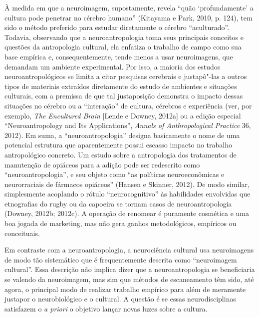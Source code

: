 À medida em que a neuroimagem, supostamente, revela ``quão
`profundamente' a cultura pode penetrar no cérebro humano'' (Kitayama
e Park, 2010, p. 124), tem sido o método preferido para estudar
diretamente o cérebro ``aculturado''. Todavia, observando que a
neuroantropologia toma seus principais conceitos e questões da
antropologia cultural, ela enfatiza o trabalho de campo como sua base
empírica e, consequentemente, tende menos a usar neuroimagens, que
demandam um ambiente experimental. Por isso, a maioria dos estudos
neuroantropológicos se limita a citar pesquisas cerebrais e justapô"-las
a outros tipos de materiais extraídos diretamente do estudo de ambientes
e situações culturais, com a premissa de que tal justaposição demonstra
o impacto dessas situações no cérebro ou a ``interação'' de cultura,
cérebros e experiência (ver, por exemplo, \emph{The Encultured Brain}
{[}Lende e Downey, 2012a{]} ou a edição especial ``Neuroantropology and
Its Applications'', \emph{Annals of Anthropological Practice} 36, 2012).
Em suma, a ``neuroantropologia'' designa basicamente o nome de uma
potencial estrutura que aparentemente possui escasso impacto no trabalho
antropológico concreto. Um estudo sobre a antropologia dos tratamentos
de manutenção de opiáceos para a adição pode ser redescrito como
``neuroantropologia'', e seu objeto como ``as políticas neuroeconômicas
e neurorraciais de fármacos opiáceos'' (Hansen e Skinner, 2012). De modo
similar, simplesmente acoplando o rótulo ``neurocognitivo'' às
habilidades envolvidas que etnografias do rugby ou da capoeira se tornam
casos de neuroantropologia (Downey, 2012b; 2012c). A operação de
renomear é puramente cosmética e uma boa jogada de marketing, mas não
gera ganhos metodológicos, empíricos ou conceituais.

Em contraste com a neuroantropologia, a neurociência cultural usa
neuroimagens de modo tão sistemático que é frequentemente descrita como
``neuroimagem cultural''. Essa descrição não implica dizer que a
neuroantropologia se beneficiaria se valendo da neuroimagem, mas sim que
métodos de escaneamento têm sido, até agora, o principal modo de
realizar trabalho empírico para além de meramente justapor o
neurobiológico e o cultural. A questão é se essas neurodisciplinas
satisfazem o \emph{a priori} o objetivo lançar novas luzes sobre a
cultura.

